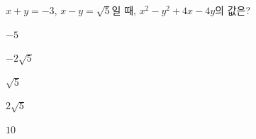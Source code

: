 $x+y=-3$, $x-y=\sqrt{5}$일 때, $x^2-y^2+4x-4y$의 값은?
\begin{choices32}{\rule[-3ex]{0pt}{8ex}$-5$}{\rule[-3ex]{0pt}{8ex}$-2\sqrt{5}$}{\rule[-3ex]{0pt}{8ex}$\sqrt{5}$}{\rule[-3ex]{0pt}{8ex}$2\sqrt{5}$}{\rule[-3ex]{0pt}{8ex}$10$}\end{choices32}
